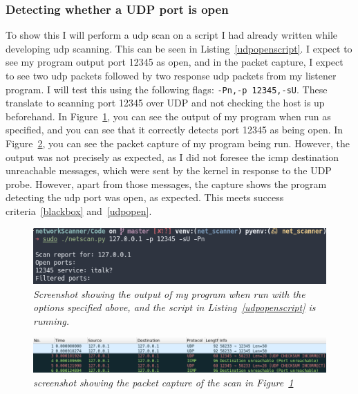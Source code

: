 \documentclass[titlepage]{article}
\let\Oldsubsubsection\subsubsection{}
\renewcommand{\subsubsection}{\FloatBarrier\Oldsubsubsection}
\begin{document}
\subsubsection{Detecting whether a UDP port is open}\label{test:udpopen}
To show this I will perform a \gls{udp} scan on a script I had already written while
developing \gls{udp} scanning.
This can be seen in Listing~\ref{udpopenscript}.
I expect to see my program output port 12345 as open, and in the packet capture, I
expect to see two \gls{udp} packets followed by two response \gls{udp} packets from my
listener program. I will test this using the following flags: \verb|-Pn,-p 12345,-sU|.
These translate to scanning port 12345 over UDP and not checking the host is up beforehand.
In Figure~\ref{udpopenoutput}, you can see the output of my program when run as specified,
and you can see that it correctly detects port 12345 as being open.
In Figure~\ref{udpopenpcap}, you can see the packet capture of my program being run.
However, the output was not precisely as expected,
as I did not foresee the \gls{icmp} destination unreachable messages,
which were sent by the kernel in response to the UDP probe.
However, apart from those messages,
the capture shows the program detecting the \gls{udp} port was open,
as expected. This meets success criteria~\ref{blackbox} and~\ref{udpopen}.



\begin{figure}[H]
  \centering
  \includegraphics[width=\textwidth]{udpopenoutput.png}
  \caption{\textit{%
    Screenshot showing the output of my program when run with the options specified
    above, and the script in Listing~\ref{udpopenscript} is running.
}}\label{udpopenoutput}
\end{figure}

\begin{figure}[H]
  \centering
  \includegraphics[width=\textwidth]{udpopenpcap.png}
  \caption{\textit{%
    screenshot showing the packet capture of the scan in Figure~\ref{udpopenoutput}
}}\label{udpopenpcap}
\end{figure}
\end{document}
